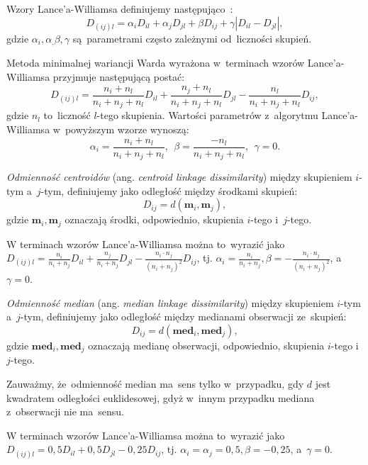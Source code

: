 \documentclass{praca1}
\begin{document}
\begin{definition}
Wzory Lance'a-Williamsa definiujemy następująco~\cite{Lance1967:hierarchical}:
$$
D_{(ij)l} = \alpha_i D_{il} + \alpha_j D_{jl} + \beta D_{ij} + \gamma |D_{il} - D_{jl}|,
$$
gdzie $\alpha_i, \alpha_, \beta, \gamma$ są~parametrami często zależnymi od~liczności skupień.
\end{definition}

Metoda minimalnej wariancji Warda wyrażona w~terminach wzorów Lance'a-Williamsa przyjmuje następującą postać:
$$
D_{(ij)l} = \frac{n_i+n_l}{n_i+n_j+n_l} D_{il} + \frac{n_j+n_l}{n_i+n_j+n_l} D_{jl} - \frac{n_l}{n_i+n_j+n_l} D_{ij},
$$
gdzie $n_l$ to~liczność $l$-tego skupienia. Wartości parametrów z~algorytmu Lance'a-Williamsa w~powyższym wzorze wynoszą:
$$
\alpha_i =  \frac{n_i+n_l}{n_i+n_j+n_l},\ \ \beta = \frac{-n_l}{n_i+n_j+n_l},\ \ \gamma = 0.
$$

\begin{definition}
\emph{Odmienność centroidów} (ang. \emph{centroid linkage dissimilarity}) między skupieniem $i$-tym a~$j$-tym, definiujemy jako odległość między środkami skupień:
$$
D_{ij} = d(\mathbf{m}_i, \mathbf{m}_j),
$$
gdzie $\mathbf{m}_i, \mathbf{m}_j$ oznaczają środki, odpowiednio, skupienia $i$-tego i~$j$-tego.
\end{definition}

W terminach wzorów Lance'a-Williamsa można to~wyrazić jako $D_{(ij)l} = \frac{n_i}{n_i + n_j} D_{il} + \frac{n_j}{n_i + n_j} D_{jl} - \frac{n_i \cdot n_j}{(n_i + n_j)^2} D_{ij} $, tj. $\alpha_i = \frac{n_i}{n_i + n_j}, \beta = - \frac{n_i \cdot n_j}{(n_i + n_j)^2}$, a~$\gamma = 0$.

\begin{definition}
\emph{Odmienność median} (ang. \emph{median linkage dissimilarity}) między skupieniem $i$-tym a~$j$-tym, definiujemy jako odległość między medianami obserwacji ze~skupień:
$$
D_{ij} = d(\mathbf{med}_i, \mathbf{med}_j),
$$
gdzie $\mathbf{med}_i, \mathbf{med}_j$ oznaczają medianę obserwacji, odpowiednio, skupienia $i$-tego i~$j$-tego.
\end{definition}

Zauważmy, że~odmienność median ma~sens tylko w~przypadku, gdy $d$ jest kwadratem odległości euklidesowej, gdyż w~innym przypadku mediana z~obserwacji nie ma~sensu.

W terminach wzorów Lance'a-Williamsa można to~wyrazić jako $D_{(ij)l} = 0{,}5 D_{il} + 0{,}5 D_{jl} - 0{,}25 D_{ij} $, tj. $\alpha_i = \alpha_j = 0{,}5, \beta = -0{,}25$, a~$\gamma = 0$.
\end{document}
